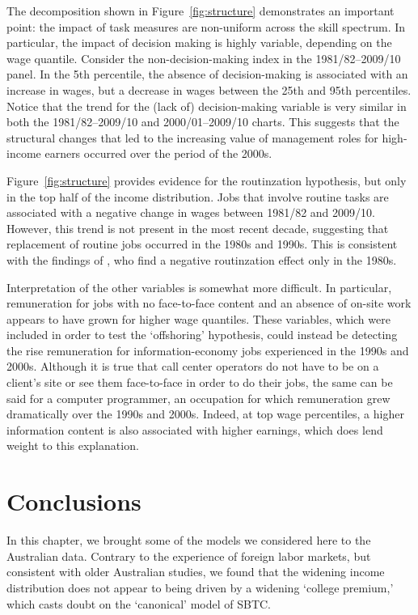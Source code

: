 The decomposition shown in Figure~\ref{fig:structure} demonstrates an important point: the impact of task measures are non-uniform across the skill spectrum. In particular, the impact of decision making is highly variable, depending on the wage quantile. Consider the non-decision-making index in the 1981/82--2009/10 panel. In the 5th percentile, the absence of decision-making is associated with an increase in wages, but a decrease in wages between the 25th and 95th percentiles. Notice that the trend for the (lack of) decision-making variable is very similar in both the 1981/82--2009/10 and 2000/01--2009/10 charts. This suggests that the structural changes that led to the increasing value of management roles for high-income earners occurred over the period of the 2000s.

Figure~\ref{fig:structure} provides evidence for the routinzation hypothesis, but only in the top half of the income distribution. Jobs that involve routine tasks are associated with a negative change in wages between 1981/82 and 2009/10. However, this trend is not present in the most recent decade, suggesting that replacement of routine jobs occurred in the 1980s and 1990s. This is consistent with the findings of \citet{Firpo2011}, who find a negative routinzation effect only in the 1980s.

Interpretation of the other variables is somewhat more difficult. In particular, remuneration for jobs with no face-to-face content and an absence of on-site work appears to have grown for higher wage quantiles. These variables, which were included in order to test the `offshoring' hypothesis, could instead be detecting the rise remuneration for information-economy jobs experienced in the 1990s and 2000s. Although it is true that call center operators do not have to be on a client's site or see them face-to-face in order to do their jobs, the same can be said for a computer programmer, an occupation for which remuneration grew dramatically over the 1990s and 2000s. Indeed, at top wage percentiles, a higher information content is also associated with higher earnings, which does lend weight to this explanation.

\section{Conclusions}

In this chapter, we brought some of the models we considered here to the Australian data. Contrary to the experience of foreign labor markets, but consistent with older Australian studies, we found that the widening income distribution does not appear to being driven by a widening `college premium,' which casts doubt on the `canonical' model of SBTC.

